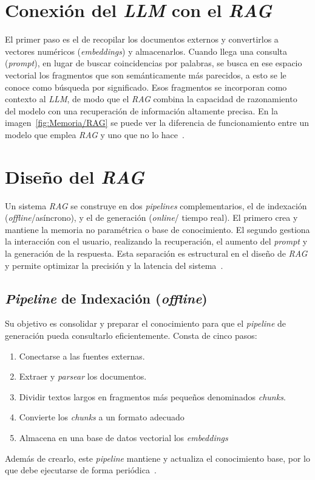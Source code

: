 \section{Conexión del \textit{LLM} con el \textit{RAG}}
El primer paso es el de recopilar los documentos externos y convertirlos a vectores numéricos (\textit{embeddings}) y almacenarlos. Cuando llega una consulta (\textit{prompt}), en lugar de buscar coincidencias por palabras, se busca en ese espacio vectorial los fragmentos que son semánticamente más parecidos, a esto se le conoce como búsqueda por significado. Esos fragmentos se incorporan como contexto al \textit{LLM}, de modo que el \textit{RAG} combina la capacidad de razonamiento del modelo con una recuperación de información altamente precisa. En la imagen~\ref{fig:Memoria/RAG} se puede ver la diferencia de funcionamiento entre un modelo que emplea \textit{RAG} y uno que no lo hace~\cite{RAG:image}.


\section{Diseño del \textit{RAG}}
Un sistema \textit{RAG} se construye en dos \textit{pipelines} complementarios, el de indexación (\textit{offline}/asíncrono), y el de generación (\textit{online}/ tiempo real). El primero crea y mantiene la memoria no paramétrica o base de conocimiento. El segundo gestiona la interacción con el usuario, realizando la recuperación, el aumento del \textit{prompt} y la generación de la respuesta. Esta separación es estructural en el diseño de \textit{RAG} y permite optimizar la precisión y la latencia del sistema~\cite{book:RAG_SimpleGuide}.

\subsection{\textit{Pipeline} de Indexación (\textit{offline})}
Su objetivo es consolidar y preparar el conocimiento para que el \textit{pipeline} de generación pueda consultarlo eficientemente. Consta de cinco pasos:
\begin{enumerate}
	\item Conectarse a las fuentes externas.
	\item Extraer y \textit{parsear} los documentos.
	\item Dividir textos largos en fragmentos más pequeños denominados \textit{chunks}.
	\item Convierte los \textit{chunks} a un formato adecuado
	\item Almacena en una base de datos vectorial los \textit{embeddings}
\end{enumerate}
Además de crearlo, este \textit{pipeline} mantiene y actualiza el conocimiento base, por lo que debe ejecutarse de forma periódica~\cite{book:RAG_SimpleGuide}.

